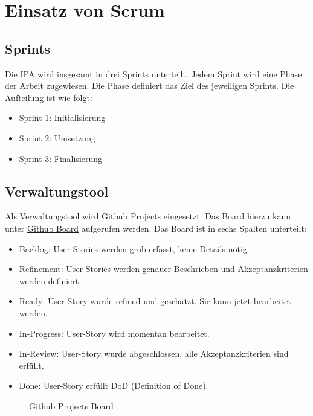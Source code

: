 \section{Einsatz von Scrum}

\subsection{Sprints}
Die IPA wird insgesamt in drei Sprints unterteilt. Jedem Sprint wird eine Phase der Arbeit zugewiesen. Die 
Phase definiert das Ziel des jeweiligen Sprints. Die Aufteilung ist wie folgt:

\begin{itemize}
    \item Sprint 1: Initialisierung
    \item Sprint 2: Umsetzung
    \item Sprint 3: Finalisierung
\end{itemize}

\subsection{Verwaltungstool}
Als Verwaltungstool wird Github Projects eingesetzt. Das Board hierzu kann unter \href{https://github.com/users/Vakmeth/projects/3/views/1}{Github Board}
aufgerufen werden. Das Board ist in sechs Spalten unterteilt: 

\begin{itemize}
    \item Backlog: User-Stories werden grob erfasst, keine Details nötig.
    \item Refinement: User-Stories werden genauer Beschrieben und Akzeptanzkriterien werden definiert.
    \item Ready: User-Story wurde refined und geschätzt. Sie kann jetzt bearbeitet werden.
    \item In-Progress: User-Story wird momentan bearbeitet.
    \item In-Review: User-Story wurde abgeschlossen, alle Akzeptanzkriterien sind erfüllt.
    \item Done: User-Story erfüllt DoD (Definition of Done).
\end{itemize}

\begin{figure}[h]
    \centering
    \caption{Github Projects Board}
\end{figure}

